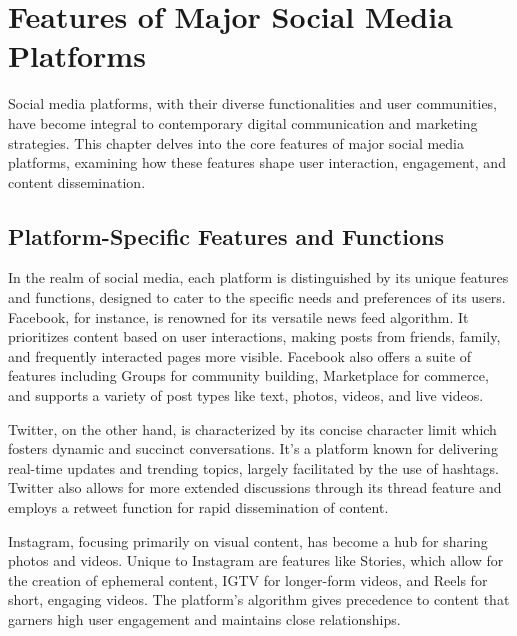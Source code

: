 \documentclass[
]{book}
\begin{document}
\hypertarget{features-of-major-social-media-platforms}{%
\section*{Features of Major Social Media Platforms}\label{features-of-major-social-media-platforms}}

Social media platforms, with their diverse functionalities and user communities, have become integral to contemporary digital communication and marketing strategies. This chapter delves into the core features of major social media platforms, examining how these features shape user interaction, engagement, and content dissemination.

\hypertarget{platform-specific-features-and-functions}{%
\subsection*{Platform-Specific Features and Functions}\label{platform-specific-features-and-functions}}

In the realm of social media, each platform is distinguished by its unique features and functions, designed to cater to the specific needs and preferences of its users. Facebook, for instance, is renowned for its versatile news feed algorithm. It prioritizes content based on user interactions, making posts from friends, family, and frequently interacted pages more visible. Facebook also offers a suite of features including Groups for community building, Marketplace for commerce, and supports a variety of post types like text, photos, videos, and live videos.

Twitter, on the other hand, is characterized by its concise character limit which fosters dynamic and succinct conversations. It's a platform known for delivering real-time updates and trending topics, largely facilitated by the use of hashtags. Twitter also allows for more extended discussions through its thread feature and employs a retweet function for rapid dissemination of content.

Instagram, focusing primarily on visual content, has become a hub for sharing photos and videos. Unique to Instagram are features like Stories, which allow for the creation of ephemeral content, IGTV for longer-form videos, and Reels for short, engaging videos. The platform's algorithm gives precedence to content that garners high user engagement and maintains close relationships.
\end{document}
